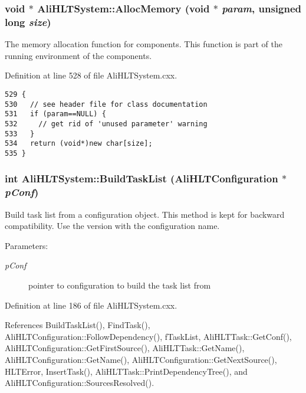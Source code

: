 \subsubsection{\setlength{\rightskip}{0pt plus 5cm}void $\ast$ Ali\-HLTSystem::Alloc\-Memory (void $\ast$ {\em param}, unsigned long {\em size})\hspace{0.3cm}{\tt  [static]}}\label{classAliHLTSystem_e0}


The memory allocation function for components. This function is part of the running environment of the components. 

Definition at line 528 of file Ali\-HLTSystem.cxx.

\footnotesize\begin{verbatim}529 {
530   // see header file for class documentation
531   if (param==NULL) {
532     // get rid of 'unused parameter' warning
533   }
534   return (void*)new char[size];
535 }
\end{verbatim}\normalsize 


\subsubsection{\setlength{\rightskip}{0pt plus 5cm}int Ali\-HLTSystem::Build\-Task\-List ({\bf Ali\-HLTConfiguration} $\ast$ {\em p\-Conf})}\label{classAliHLTSystem_a8}


Build task list from a configuration object. This method is kept for backward compatibility. Use the version with the configuration name. \begin{Desc}
\item[Parameters:]
\begin{description}
\item[{\em p\-Conf}]pointer to configuration to build the task list from \end{description}
\end{Desc}


Definition at line 186 of file Ali\-HLTSystem.cxx.

References Build\-Task\-List(), Find\-Task(), Ali\-HLTConfiguration::Follow\-Dependency(), f\-Task\-List, Ali\-HLTTask::Get\-Conf(), Ali\-HLTConfiguration::Get\-First\-Source(), Ali\-HLTTask::Get\-Name(), Ali\-HLTConfiguration::Get\-Name(), Ali\-HLTConfiguration::Get\-Next\-Source(), HLTError, Insert\-Task(), Ali\-HLTTask::Print\-Dependency\-Tree(), and Ali\-HLTConfiguration::Sources\-Resolved().

